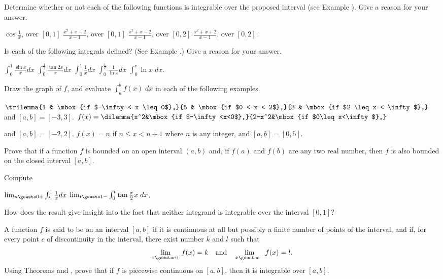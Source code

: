 \begin{exercises}

Determine whether or not each of the following
functions is integrable over the proposed interval
(see Example ).
Give a reason for your answer.
\begin{exenum}
\x
$\cos \frac1x$, over $[0,1]$
\x
$\frac{x^2+x-2}{x-1}$, over $[0,1]$
\x
$\frac{x^2+x-2}{x-1}$, over $[0,2]$
\x
$\frac{x^2+x+2}{x-1}$, over $[0,2]$.
\end{exenum}

Is each of the following integrals defined?
(See Example .)
Give a reason for your answer.
\begin{exenum}
\x
$\int_0^1 \frac{\sin x}x dx$
\x
$\int_0^{\frac12} \frac{\tan 2x}x dx$
\x
$\int_0^1 \frac1x dx$
\x
$\int_0^{\frac1e} \frac1{\ln x}dx$
\x
$\int_0^e \ln x \; dx$.
\end{exenum}

Draw the graph of $f$, and evaluate
$\int_a^b f(x) \; dx$ in each of the
following examples.
\begin{exenum}
\x
$\trilemma{1 & \mbox{if $-\infty < x \leq 0$},}
{5 & \mbox{if $0 < x < 2$},}
{3 & \mbox{if $2 \leq x < \infty$},}$
and $[a,b] = [-3,3]$.
\x
$f(x) = \dilemma{x^2&\mbox{if $-\infty<x<0$},}
{2-x^2&\mbox{if $0\leq x<\infty$},}$

and $[a,b] = [-2,2]$.
\x
$f(x) = n$ \quad if $n \leq x < n+1$
where $n$ is any integer,
and $[a,b] = [0,5]$.
\end{exenum}

Prove that if a function $f$ is bounded on an open
interval $(a,b)$ and, if $f(a)$ and $f(b)$ are any
two real number, then $f$ is also bounded
on the closed interval $[a,b]$.

Compute
\begin{exenum}
\x
$\lim_{n\goesto0+} \int_t^1 \frac1x dx$
\x
$\lim_{t\goesto1-} \int_0^t \tan \frac{\pi}2 x \; dx$.
\end{exenum}
How does the result give insight into the fact
that neither integrand is integrable over the interval
$[0,1]$?

A function $f$ is said to be 
on an interval $[a,b]$ if it is continuous at all
but possibly a finite number of points of the
interval, and if, for every point $c$ of discontinuity
in the interval, there exist number $k$ and $l$
such that
\[
\lim_{x\goesto c+} f(x) = k \quad \mbox{and}
\quad \lim_{x\goesto c-} f(x) = l
.
\]
Using Theorems  and ,
prove that if $f$ is piecewise continuous
on $[a,b]$, then it is integrable over $[a,b]$.

\end{exercises}
